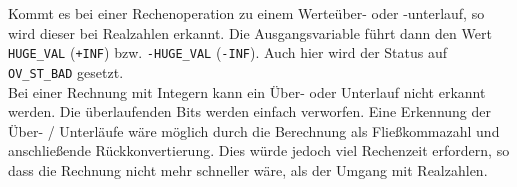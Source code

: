 Kommt es bei einer Rechenoperation zu einem Werteüber- oder -unterlauf, so wird dieser bei Realzahlen erkannt. Die Ausgangsvariable führt dann den Wert \texttt{HUGE\_VAL} (\texttt{+INF}) bzw. \texttt{-HUGE\_VAL} (\texttt{-INF}). Auch hier wird der Status auf \texttt{OV\_ST\_BAD} gesetzt.\\
Bei einer Rechnung mit Integern kann ein Über- oder Unterlauf nicht erkannt werden. Die überlaufenden Bits werden einfach verworfen. Eine Erkennung der Über- / Unterläufe wäre möglich durch die Berechnung als Fließkommazahl und anschließende Rückkonvertierung. Dies würde jedoch viel Rechenzeit erfordern, so dass die Rechnung nicht mehr schneller wäre, als der Umgang mit Realzahlen.\\

